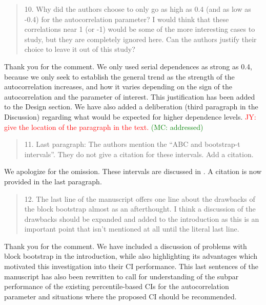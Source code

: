 \documentclass[12pt]{article}
\newcommand{\jy}[1]{\textcolor{red}{JY: #1}}
\newcommand{\mc}[1]{\textcolor{green}{(MC: #1)}}
\newenvironment{comment}%
{\begin{quotation}\noindent\small\it\color{darkblue}\ignorespaces%
}{\end{quotation}}
\begin{document}
\begin{comment}
10.   Why did the authors choose to only go as high as 0.4 (and as low as -0.4) 
for the autocorrelation parameter?  I would think that these correlations near 1 
(or -1) would be some of the more interesting cases to study, but they are 
completely ignored here.  Can the authors justify their choice to leave it out 
of this study?
\end{comment}

Thank you for the comment. We only
used serial dependences as strong as 0.4, because we only seek to 
establish the 
general trend as the strength of the autocorrelation 
increases, and how it varies depending on the sign of the autocorrelation and 
the parameter of interest. This justification has been added to the Design 
section. We have also added a deliberation (third paragraph in the Discussion) 
regarding what would
be expected for higher dependence levels.
\jy{give the location of the paragraph in the text.}
\mc{addressed}


\begin{comment}
11.    Last paragraph: The authors mention the “ABC and bootstrap-t intervals”.  
They do not give a citation for these intervals.   Add a citation. 
\end{comment}

We apologize for the omission. These intervals are discussed in 
\citet{efron1993introduction}. A citation is now provided in the last paragraph.

\begin{comment}
12.    The last line of the manuscript offers one line about the drawbacks of 
the block bootstrap almost as an afterthought.  I think a discussion of the 
drawbacks should be expanded and added to the introduction as this is an 
important point that isn’t mentioned at all until the literal last line. 
\end{comment}

Thank you for the comment. We have included a discussion of problems 
with block bootstrap in the introduction, while also highlighting its advantages
which motivated this investigation into their CI performance. This
last sentences of the manuscript has also been rewritten to call for
understanding of the subpar performance of the existing
percentile-based CIs for the autocorrelation parameter and situations
where the proposed CI should be recommended.




\end{document}
